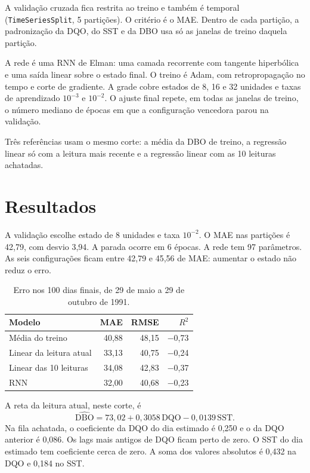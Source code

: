 \documentclass[11pt,a4paper]{article}
\begin{document}
A validação cruzada fica restrita ao treino e também é temporal (\texttt{TimeSeriesSplit}, 5 partições). O critério é o MAE. Dentro de cada partição, a padronização da DQO, do SST e da DBO usa só as janelas de treino daquela partição.

A rede é uma RNN de Elman: uma camada recorrente com tangente hiperbólica e uma saída linear sobre o estado final. O treino é Adam, com retropropagação no tempo e corte de gradiente. A grade cobre estados de 8, 16 e 32 unidades e taxas de aprendizado \(10^{-3}\) e \(10^{-2}\). O ajuste final repete, em todas as janelas de treino, o número mediano de épocas em que a configuração vencedora parou na validação.

Três referências usam o mesmo corte: a média da DBO de treino, a regressão linear só com a leitura mais recente e a regressão linear com as 10 leituras achatadas.

\section{Resultados}

A validação escolhe estado de 8 unidades e taxa \(10^{-2}\). O MAE nas partições é 42,79, com desvio 3,94. A parada ocorre em 6 épocas. A rede tem 97 parâmetros. As seis configurações ficam entre 42,79 e 45,56 de MAE: aumentar o estado não reduz o erro.

\begin{table}[H]
\centering
\caption{Erro nos 100 dias finais, de 29 de maio a 29 de outubro de 1991.}
\begin{tabular}{lrrr}
\toprule
Modelo & MAE & RMSE & \(R^{2}\) \\
\midrule
Média do treino & 40,88 & 48,15 & $-$0,73 \\
Linear da leitura atual & 33,13 & 40,75 & $-$0,24 \\
Linear das 10 leituras & 34,08 & 42,83 & $-$0,37 \\
RNN & 32,00 & 40,68 & $-$0,23 \\
\bottomrule
\end{tabular}
\end{table}

A reta da leitura atual, neste corte, é
\begin{equation}
\widehat{\mathrm{DBO}} = 73{,}02 + 0{,}3058\,\mathrm{DQO} - 0{,}0139\,\mathrm{SST}.
\end{equation}
Na fila achatada, o coeficiente da DQO do dia estimado é 0,250 e o da DQO anterior é 0,086. Os lags mais antigos de DQO ficam perto de zero. O SST do dia estimado tem coeficiente cerca de zero. A soma dos valores absolutos é 0,432 na DQO e 0,184 no SST.
\end{document}
